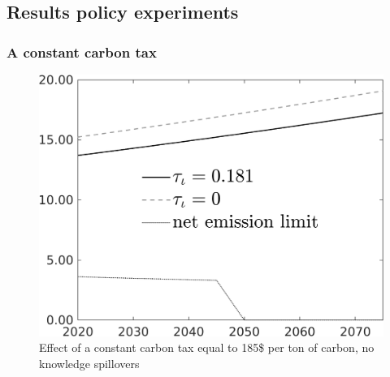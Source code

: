 \subsection{Results policy experiments}\label{app:polexp}

\subsubsection{A constant carbon tax}
 \begin{figure}[h!!]
	\centering
	\caption{Effect of a constant carbon tax equal to 185\$ per ton of carbon, no knowledge spillovers }\label{fig:Leveltauf_nsk0_xgr0_noknow}		
	\begin{minipage}[]{0.32\textwidth}
		\includegraphics[width=1\textwidth]{../../codding_model/own_basedOnFried/optimalPol_010922_revision/figures/all_13Sept22/CompTauf_bytaul_Reg0_Emnet_spillover0_nsk0_xgr0_knspil1_sep0_LFlimit0_emsbase0_countec0_GovRev0_etaa0.79_lgd1.png}
	\end{minipage}	
	\begin{minipage}[]{0.32\textwidth}

\end{minipage}
\end{figure}
